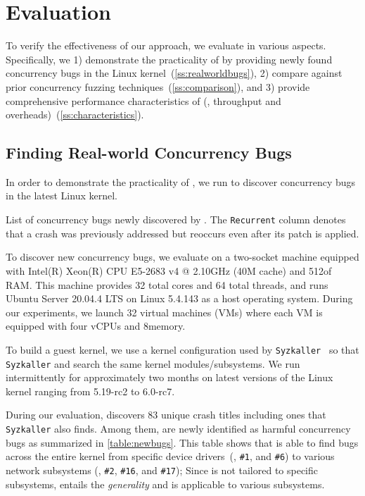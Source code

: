 \section{Evaluation}
\label{s:eval}

To verify the effectiveness of our approach, we evaluate \sys in
various aspects.
%
Specifically, we 1) demonstrate the practicality of \sys by providing
newly found concurrency bugs in the Linux
kernel~(\autoref{ss:realworldbugs}),
%
2) compare \sys against prior concurrency fuzzing
techniques~(\autoref{ss:comparison}), and
%
3) provide comprehensive performance characteristics of \sys (\eg,
throughput and overheads)~(\autoref{ss:characteristics}).
%

\subsection{Finding Real-world Concurrency Bugs}
\label{ss:realworldbugs}

In order to demonstrate the practicality of \sys, we run \sys to
discover concurrency bugs in the latest Linux kernel.

\begin{table}[t]
  \centering
  
  \caption{List of concurrency bugs newly discovered by \sys. The
    \texttt{Recurrent} column denotes that a crash was previously
    addressed but reoccurs even after its patch is applied.}
  \label{table:newbugs}
\end{table}

%
To discover new concurrency bugs, we evaluate \sys on a two-socket
machine equipped with Intel(R) Xeon(R) CPU E5-2683 v4 @ 2.10GHz (40M
cache) and 512\GB of RAM.
%
This machine provides 32 total cores and 64 total threads, and runs
Ubuntu Server 20.04.4 LTS on Linux 5.4.143 as a host operating system.
%
During our experiments, we launch 32 virtual machines (VMs) where each
VM is equipped with four vCPUs and 8\GB memory.

To build a guest kernel, we use a kernel configuration used by
\texttt{Syzkaller}~\cite{syzkaller} so that \texttt{Syzkaller} and
\sys search the same kernel modules/subsystems.
%
We run intermittently \sys for approximately two months on latest
versions of the Linux kernel ranging from 5.19-rc2 to 6.0-rc7.


%
During our evaluation, \sys discovers 83 unique crash titles including
ones that \texttt{Syzkaller} also finds. Among them, \totalbugs are
newly identified as harmful concurrency bugs as summarized in
\autoref{table:newbugs}.
%
This table shows that \sys is able to find bugs across the entire
kernel from specific device drivers~(\eg, \texttt{\#1}, and
\texttt{\#6}) to various network subsystems (\eg, \texttt{\#2},
\texttt{\#16}, and \texttt{\#17}); Since \sys is not tailored to
specific subsystems, \sys entails the \textit{generality} and is
applicable to various subsystems.

